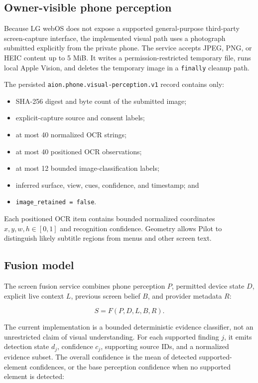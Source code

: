\documentclass[11pt,a4paper]{article}
\begin{document}
\subsection{Owner-visible phone perception}

Because LG webOS does not expose a supported general-purpose third-party
screen-capture interface, the implemented visual path uses a photograph
submitted explicitly from the private phone.\cite{webosscreenshot} The service
accepts JPEG, PNG, or HEIC content up to 5 MiB.  It writes a
permission-restricted temporary file,
runs local Apple Vision, and deletes the temporary image in a
\texttt{finally} cleanup path.

The persisted \texttt{aion.phone.visual-perception.v1} record contains only:

\begin{itemize}[leftmargin=*]
  \item SHA-256 digest and byte count of the submitted image;
  \item explicit-capture source and consent labels;
  \item at most 40 normalized OCR strings;
  \item at most 40 positioned OCR observations;
  \item at most 12 bounded image-classification labels;
  \item inferred surface, view, cues, confidence, and timestamp; and
  \item \texttt{image\_retained = false}.
\end{itemize}

Each positioned OCR item contains bounded normalized coordinates
$x,y,w,h\in[0,1]$ and recognition confidence.  Geometry allows Pilot to
distinguish likely subtitle regions from menus and other screen text.

\subsection{Fusion model}

The screen fusion service combines phone perception $P$, permitted device state
$D$, explicit live context $L$, previous screen belief $B$, and provider
metadata $R$:

\begin{equation}
 S = F(P,D,L,B,R).
\end{equation}

The current implementation is a bounded deterministic evidence classifier,
not an unrestricted claim of visual understanding.  For each supported finding
$j$, it emits detection state $d_j$, confidence $c_j$, supporting source IDs,
and a normalized evidence subset.  The overall confidence is the mean of
detected supported-element confidences, or the base perception confidence when
no supported element is detected:
\end{document}
